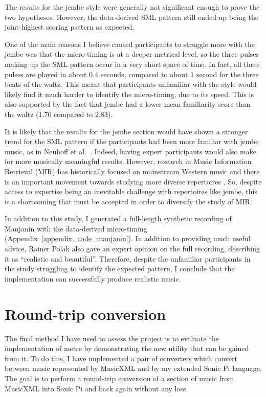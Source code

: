 \documentclass[12pt,twoside,openright]{report}
\begin{document}
The results for the jembe style were generally not significant enough to prove
the two hypotheses. However, the data-derived SML pattern still ended up being
the joint-highest scoring pattern as expected.

One of the main reasons I believe caused participants to struggle more with the
jembe was that the micro-timing is at a deeper metrical level, so the three
pulses making up the SML pattern occur in a very short space of time. In fact, all three pulses are
played in about 0.4 seconds, compared to about 1 second for the three beats of
the waltz. This meant that participants unfamiliar with the style would likely
find it much harder to identify the micro-timing, due to its speed. This is also
supported by the fact that jembe had a lower mean familiarity score than the
waltz (1.70 compared to 2.83).

It is likely that the results for the jembe section would have shown a stronger
trend for the SML pattern if the participants had been more familiar with jembe
music, as in Neuhoff et al.\ \cite{neuhoff2017}. Indeed, having expert participants would also make for more musically meaningful results. However, research in Music Information Retrieval (MIR) has historically focused on mainstream Western music \cite{gomez2013} and there is an important movement towards studying more diverse repertoires \cite{born2020}.
So, despite access to expertise being an inevitable challenge with repertoires like jembe, this is a shortcoming that must be accepted in order to diversify the study of MIR.

In addition to this study, I generated a full-length synthetic recording of
Manjanin with the data-derived micro-timing (Appendix~\ref{appendix_code_manjanin}). In addition to providing much
useful advice, Rainer Polak also gave an expert opinion on the full recording,
describing it as ``realistic and beautiful''. Therefore, despite the unfamiliar
participants in the study struggling to identify the expected pattern, I conclude that the implementation can successfully produce realistic music.
\newpage



\section{Round-trip conversion} \label{metre_evaluation}

The final method I have used to assess the project is to evaluate the
implementation of metre by demonstrating the new utility that can be gained from
it. To do this, I have implemented a pair of converters which convert between
music represented by MusicXML and by my extended Sonic Pi language. The goal is
to perform a round-trip conversion of a section of music from MusicXML into Sonic Pi and back again without any loss.
\end{document}
